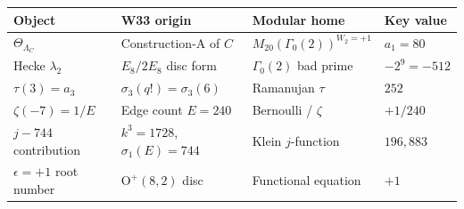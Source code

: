 \begin{center}
\small
\begin{tabular}{@{}llll@{}}
\toprule
\textbf{Object} & \textbf{W33 origin} & \textbf{Modular home} & \textbf{Key value} \\
\midrule
$\Theta_{\Lambda_C}$ & Construction-A of $C$ & $M_{20}(\Gamma_0(2))^{W_2=+1}$ & $a_1 = 80$ \\
Hecke $\lambda_2$ & $E_8/2E_8$ disc form & $\Gamma_0(2)$ bad prime & $-2^9 = -512$ \\
$\tau(3) = a_3$ & $\sigma_3(q!) = \sigma_3(6)$ & Ramanujan $\tau$ & $252$ \\
$\zeta(-7) = 1/E$ & Edge count $E = 240$ & Bernoulli / $\zeta$ & $+1/240$ \\
$j - 744$ contribution & $k^3 = 1728$, $\sigma_1(E) = 744$ & Klein $j$-function & $196{,}883$ \\
$\epsilon = +1$ root number & $\mathrm{O}^+(8,2)$ disc & Functional equation & $+1$ \\
\bottomrule
\end{tabular}
\end{center}
